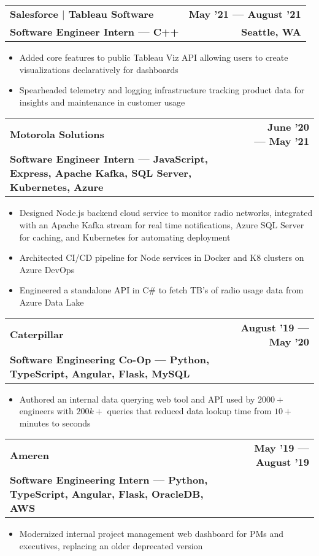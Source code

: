 \documentclass[letterpaper,11pt]{article}
\makeatletter
\newcommand{\resumeItem}[1]{
  \item\small{
    {#1 \vspace{-1pt}}
  }
}
\newcommand{\resumeSubheadingSmall}[4]{
  \vspace{-0pt}
  \item
    \begin{tabular*}{1\textwidth}[t]{l@{\extracolsep{\fill}}r}
      \textbf{#1} & \small{\color{main}\textbf{#2}} \\
      \color{secondary}\textbf{\footnotesize#3} & \color{secondary}\textbf{\footnotesize#4} \\
    \end{tabular*}\vspace{-7pt}
}
\newcommand{\resumeItemListStart}{\begin{itemize}}
\newcommand{\resumeItemListEnd}{\end{itemize}\vspace{0pt}}
\makeatother
\begin{document}
\resumeSubheadingSmall
{Salesforce $|$ Tableau Software} %
{May '21 --- August '21} %
{Software Engineer Intern --- C++} %
{Seattle, WA} %
\resumeItemListStart
\resumeItem{Added core features to public Tableau Viz API allowing users to create visualizations declaratively for dashboards}
\resumeItem{Spearheaded telemetry and logging infrastructure tracking product data for insights and maintenance in customer usage}
\resumeItemListEnd

\resumeSubheadingSmall
{Motorola Solutions} %
{June '20 --- May '21} %
{Software Engineer Intern --- JavaScript, Express, Apache Kafka, SQL Server, Kubernetes, Azure} %
{} %
\resumeItemListStart
\resumeItem{Designed Node.js backend cloud service to monitor radio networks, integrated with an Apache Kafka stream for real time notifications, Azure SQL Server for caching, and Kubernetes for automating deployment}
\resumeItem{Architected CI/CD pipeline for Node services in Docker and K8 clusters on Azure DevOps}
\resumeItem{Engineered a standalone API in C\# to fetch TB's of radio usage data from Azure Data Lake}
\resumeItemListEnd

\resumeSubheadingSmall
{Caterpillar} %
{August '19 --- May '20} %
{Software Engineering Co-Op --- Python, TypeScript, Angular, Flask, MySQL} %
{} %
\resumeItemListStart
\resumeItem{Authored an internal data querying web tool and API used by $2000+$ engineers with $200k+$ queries that reduced data lookup time from $10+$ minutes to seconds}
\resumeItemListEnd

\resumeSubheadingSmall
{Ameren} %
{May '19 --- August '19} %
{Software Engineering Intern --- Python, TypeScript, Angular, Flask, OracleDB, AWS} %
{} %
\resumeItemListStart
\resumeItem{Modernized internal project management web dashboard for PMs and executives, replacing an older deprecated version}
\resumeItemListEnd

\end{document}
